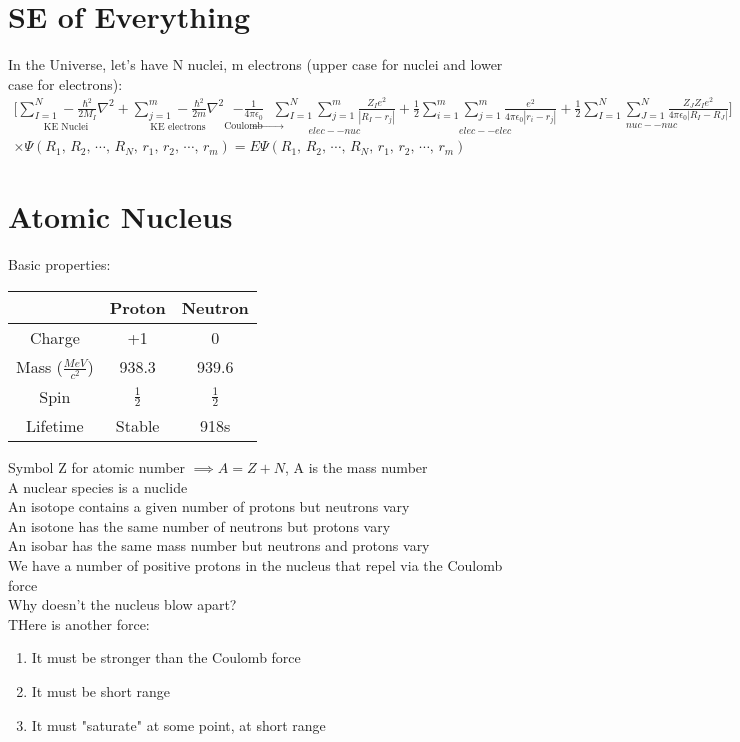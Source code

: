 \documentclass[a4paper, 11pt, fleqn, normalem]{report}
\begin{document}
\section{SE of Everything}
In the Universe, let's have N nuclei, m electrons (upper case for nuclei and lower case for electrons):
\begin{multline*}
    \Bigg[\underset{\text{KE Nuclei}}{\sum_{I = 1}^{N}-\frac{\hbar^{2}}{2M_{I}}\nabla^{2}} + \underset{\text{KE electrons}}{\sum_{j = 1}^{m}-\frac{\hbar^{2}}{2m} \nabla^{2}} \underset{\text{Coulomb} \rightarrow}{- \frac{1}{4\pi\epsilon_{0}}} \underset{elec--nuc}{\sum_{I = 1}^{N}\sum_{j = 1}^{m}\frac{Z_{I}e^{2}}{|R_{I} - r_{j}|}} + \underset{elec--elec}{\frac{1}{2}\sum_{i = 1}^{m}\sum_{j = 1}^{m}\frac{e^{2}}{4\pi\epsilon_{0}|r_{i} - r_{j}|}} + \underset{nuc--nuc}{\frac{1}{2}\sum_{I = 1}^{N}\sum_{J = 1}^{N}\frac{Z_{J}Z_{I}e^{2}}{4\pi\epsilon_{0}|R_{I} - R_{J}|}}\Bigg] \\
    \times \Psi(R_{1},\,R_{2},\, \cdots ,\,R_{N},\,r_{1},\,r_{2},\, \cdots ,\,r_{m}) = E\Psi(R_{1},\,R_{2},\, \cdots ,\,R_{N},\,r_{1},\,r_{2},\, \cdots ,\,r_{m})
\end{multline*}

\newpage
\section{Atomic Nucleus}
Basic properties:
\begin{table}[H]
    \begin{tabular}{c|c|c}
               & Proton & Neutron   \\
        \hline
        Charge & +1     & 0         \\
        Mass ($\frac{MeV}{c^{2}}$)  & 938.3  & 939.6   \\
        Spin   & $\frac{1}{2}$ & $\frac{1}{2}$ \\
        Lifetime & Stable & 918s
    \end{tabular}
\end{table}
Symbol Z for atomic number $\implies A = Z + N$, A is the mass number \\
A nuclear species is a nuclide \\
An isotope contains a given number of protons but neutrons vary \\
An isotone has the same number of neutrons but protons vary \\
An isobar has the same mass number but neutrons and protons vary \\
We have a number of positive protons in the nucleus that repel via the Coulomb force \\
Why doesn't the nucleus blow apart? \\
THere is another force:
\begin{enumerate}
    \item It must be stronger than the Coulomb force
    \item It must be short range
    \item It must "saturate" at some point, at short range
\end{enumerate}
\end{document}
